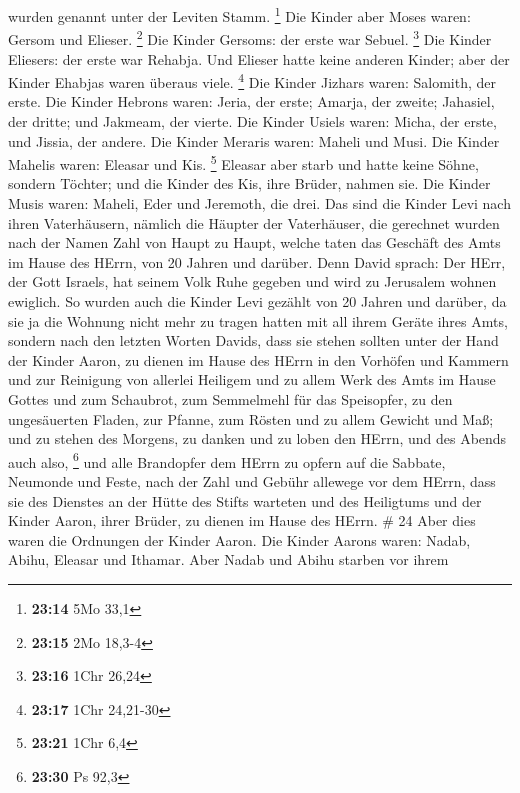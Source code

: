 wurden genannt unter der Leviten Stamm. \footnote{\textbf{23:14} 5Mo
  33,1}  Die Kinder aber Moses waren: Gersom und Elieser.
\footnote{\textbf{23:15} 2Mo 18,3-4}  Die Kinder Gersoms:
der erste war Sebuel. \footnote{\textbf{23:16} 1Chr 26,24} 
Die Kinder Eliesers: der erste war Rehabja. Und Elieser hatte keine
anderen Kinder; aber der Kinder Ehabjas waren überaus viele. \footnote{\textbf{23:17}
  1Chr 24,21-30}  Die Kinder Jizhars waren: Salomith, der
erste.  Die Kinder Hebrons waren: Jeria, der erste; Amarja,
der zweite; Jahasiel, der dritte; und Jakmeam, der vierte. 
Die Kinder Usiels waren: Micha, der erste, und Jissia, der andere.
 Die Kinder Meraris waren: Maheli und Musi. Die Kinder
Mahelis waren: Eleasar und Kis. \footnote{\textbf{23:21} 1Chr 6,4}
 Eleasar aber starb und hatte keine Söhne, sondern Töchter;
und die Kinder des Kis, ihre Brüder, nahmen sie.  Die
Kinder Musis waren: Maheli, Eder und Jeremoth, die drei. 
Das sind die Kinder Levi nach ihren Vaterhäusern, nämlich die Häupter
der Vaterhäuser, die gerechnet wurden nach der Namen Zahl von Haupt zu
Haupt, welche taten das Geschäft des Amts im Hause des HErrn, von 20
Jahren und darüber.  Denn David sprach: Der HErr, der Gott
Israels, hat seinem Volk Ruhe gegeben und wird zu Jerusalem wohnen
ewiglich.  So wurden auch die Kinder Levi gezählt von 20
Jahren und darüber, da sie ja die Wohnung nicht mehr zu tragen hatten
mit all ihrem Geräte ihres Amts,  sondern nach den letzten
Worten Davids,  dass sie stehen sollten unter der Hand der
Kinder Aaron, zu dienen im Hause des HErrn in den Vorhöfen und Kammern
und zur Reinigung von allerlei Heiligem und zu allem Werk des Amts im
Hause Gottes  und zum Schaubrot, zum Semmelmehl für das
Speisopfer, zu den ungesäuerten Fladen, zur Pfanne, zum Rösten und zu
allem Gewicht und Maß;  und zu stehen des Morgens, zu
danken und zu loben den HErrn, und des Abends auch also, \footnote{\textbf{23:30}
  Ps 92,3}  und alle Brandopfer dem HErrn zu opfern auf die
Sabbate, Neumonde und Feste, nach der Zahl und Gebühr allewege vor dem
HErrn,  dass sie des Dienstes an der Hütte des Stifts
warteten und des Heiligtums und der Kinder Aaron, ihrer Brüder, zu
dienen im Hause des HErrn. \# 24  Aber dies waren die
Ordnungen der Kinder Aaron. Die Kinder Aarons waren: Nadab, Abihu,
Eleasar und Ithamar.  Aber Nadab und Abihu starben vor ihrem
